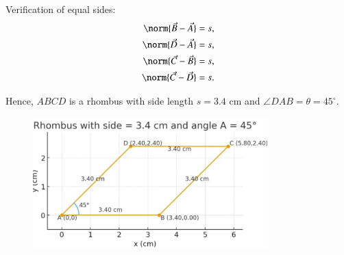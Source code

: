 \documentclass[journal]{IEEEtran}
\begin{document}
\noindent
Verification of equal sides:
\begin{align}
    \norm{\vec{B}-\vec{A}} &= s,                        \label{eq:check1}\\
    \norm{\vec{D}-\vec{A}} &= s,                        \label{eq:check2}\\
    \norm{\vec{C}-\vec{B}} &= s,                        \label{eq:check3}\\
    \norm{\vec{C}-\vec{D}} &= s.                        \label{eq:check4}
\end{align}

\noindent
Hence, $ABCD$ is a rhombus with side length $s=3.4$ cm and $\angle DAB = \theta = 45^\circ$.


\begin{figure}[h!]
    \centering
    \includegraphics[height=0.4\textheight, keepaspectratio]{fig3.4.5}
    \label{figure_1}
\end{figure}
 
\end{document}
